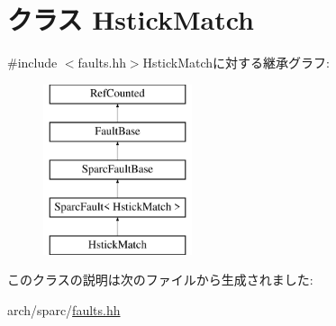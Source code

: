 \hypertarget{classSparcISA_1_1HstickMatch}{
\section{クラス HstickMatch}
\label{classSparcISA_1_1HstickMatch}
}


{\ttfamily \#include $<$faults.hh$>$}HstickMatchに対する継承グラフ:\begin{figure}[H]
\begin{center}
\leavevmode
\includegraphics[height=5cm]{classSparcISA_1_1HstickMatch}
\end{center}
\end{figure}


このクラスの説明は次のファイルから生成されました:\begin{DoxyCompactItemize}
\item 
arch/sparc/\hyperlink{arch_2sparc_2faults_8hh}{faults.hh}\end{DoxyCompactItemize}
